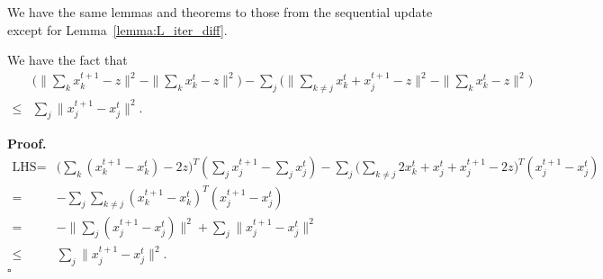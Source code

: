 We have the same lemmas and theorems to those from the sequential update except for Lemma~\ref{lemma:L_iter_diff}. 
\begin{lemma}\label{lemma:algebra_1}
    We have the fact that
    \begin{align}
        & \big(\|\sum_k x_k^{t+1} - z\|^2 - \|\sum_k x_k^{t} - z\|^2\big) - \sum_j\big(\|\sum_{k\neq j} x_k^{t} + x_j^{t+1} - z\|^2 - \|\sum_k x_k^{t} - z\|^2\big)\nonumber\\
        \le & \sum_j\|x_j^{t+1} - x_j^{t}\|^2. 
    \end{align}
\end{lemma}
{\bf Proof.} 
\begin{align}
    \text{LHS} = & \big(\sum_k(x_k^{t+1} - x_k^{t}) - 2z\big)^T(\sum_j x_j^{t+1} - \sum_j x_j^t) - \sum_j\big(\sum_{k\neq j}2x_k^t + x_j^t + x_j^{t+1} -2z\big)^T(x_j^{t+1} - x_j^t)\nonumber\\
    = & - \sum_j \sum_{k\neq j}(x_k^{t+1} - x_k^{t})^T(x_j^{t+1} - x_j^t)\nonumber\\
    = & - \|\sum_j (x_j^{t+1} - x_j^{t})\|^2 + \sum_j\|x_j^{t+1} - x_j^{t}\|^2\nonumber\\
    \le & \sum_j\|x_j^{t+1} - x_j^{t}\|^2.\nonumber
\end{align}
\hfill$\square$

